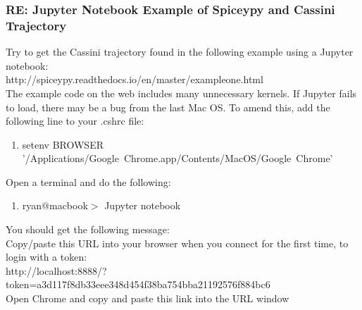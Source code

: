 \documentclass[crop=false,class=book]{standalone}
\begin{document}
\subsubsection{\footnotesize RE: Jupyter Notebook Example of Spiceypy and Cassini Trajectory}
Try to get the Cassini trajectory found in the following example using a Jupyter notebook:\\
http://spiceypy.readthedocs.io/en/master/exampleone.html\\
The example code on the web includes many unnecessary kernels. If Jupyter fails to load, there may be a bug from the last Mac OS. To amend this, add the following line to your .cshrc file:
\begin{enumerate}
    \item[] setenv BROWSER '/Applications/Google\ Chrome.app/Contents/MacOS/Google\ Chrome'
\end{enumerate}
Open a terminal and do the following:
\begin{enumerate}
    \item[] ryan$@$macbook$>$ Jupyter notebook
\end{enumerate}
You should get the following message:\\
Copy/paste this URL into your browser when you connect for the first time, to login with a token:\\
http://localhost:8888/?token=a3d117f8db33eee348d454f38ba754bba21192576f884bc6\\
Open Chrome and copy and paste this link into the URL window
\end{document}
